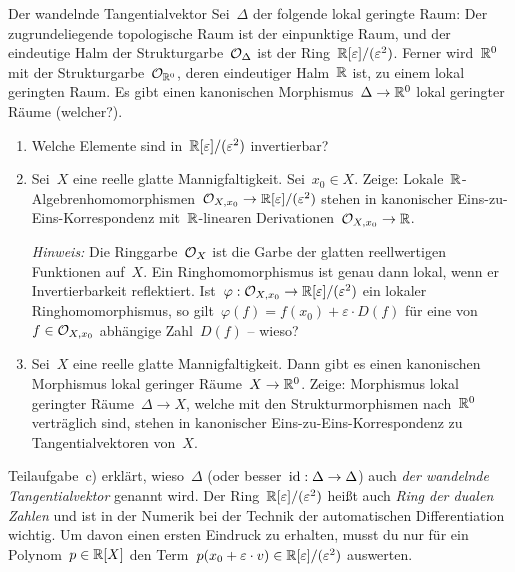 \documentclass{uebblatt}
\newcommand{\dualnumbers}{\ensuremath{\RR[\varepsilon]/(\varepsilon^2)}}
\begin{document}

\begin{aufgabe}{Der wandelnde Tangentialvektor}
Sei~$\Delta$ der folgende lokal geringte Raum: Der zugrundeliegende
topologische Raum ist der einpunktige Raum, und der eindeutige Halm der
Strukturgarbe~$\mathcal{O}_\Delta$ ist der Ring~\dualnumbers.
Ferner wird~$\mathbb{R}^0$ mit der Strukturgarbe~$\mathcal{O}_{\mathbb{R}^0}$, deren eindeutiger
Halm~$\mathbb{R}$ ist, zu einem lokal geringten Raum. Es gibt einen kanonischen
Morphismus~$\Delta \to \mathbb{R}^0$ lokal geringter Räume (welcher?).

\begin{enumerate}
\item Welche Elemente sind in~\dualnumbers{} invertierbar?
\item Sei~$X$ eine reelle glatte Mannigfaltigkeit. Sei~$x_0 \in X$. Zeige:
Lokale~$\mathbb{R}$-Al\-geb\-ren\-ho\-mo\-mor\-phis\-men~$\O_{X,x_0} \to \dualnumbers$ stehen in
kanonischer Eins-zu-Eins-Korrespondenz mit~$\mathbb{R}$-linearen Derivationen~$\mathcal{O}_{X,x_0} \to \mathbb{R}$.

\emph{Hinweis:} Die Ringgarbe~$\mathcal{O}_X$ ist die Garbe der glatten reellwertigen
Funktionen auf~$X$. Ein Ringhomomorphismus ist genau dann lokal, wenn er
Invertierbarkeit reflektiert. Ist~$\varphi : \O_{X,x_0} \to \dualnumbers$ ein
lokaler Ringhomomorphismus, so gilt~$\varphi(f) = f(x_0) + \varepsilon \cdot
D(f)$ für eine von~$f \in \mathcal{O}_{X,x_0}$ abhängige Zahl~$D(f)$ -- wieso?
\item Sei~$X$ eine reelle glatte Mannigfaltigkeit. Dann gibt es einen
kanonischen Morphismus lokal geringer Räume~$X \to \mathbb{R}^0$. Zeige: Morphismus
lokal geringter Räume~$\Delta \to X$, welche mit den Strukturmorphismen
nach~$\mathbb{R}^0$ verträglich sind, stehen in kanonischer Eins-zu-Eins-Korrespondenz
zu Tangentialvektoren von~$X$.
\end{enumerate}

Teilaufgabe~c) erklärt, wieso~$\Delta$ (oder besser~$\mathrm{id} : \Delta \to \Delta$)
auch \emph{der wandelnde Tangentialvektor} genannt wird. Der
Ring~$\dualnumbers$ heißt auch \emph{Ring der dualen Zahlen} und ist in der
Numerik bei der Technik der automatischen Differentiation wichtig. Um davon
einen ersten Eindruck zu erhalten, musst du nur für ein Polynom~$p \in \mathbb{R}[X]$
den Term~$p(x_0 + \varepsilon \cdot v) \in \dualnumbers$ auswerten.
\end{aufgabe}
\end{document}
